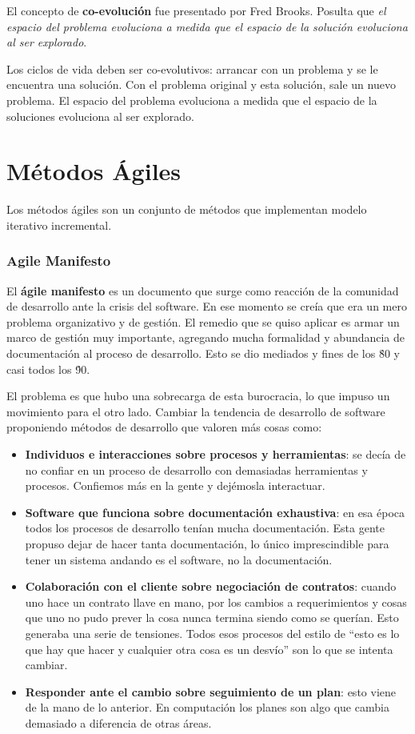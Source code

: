 \documentclass[]{article}
\begin{document}
El concepto de \textbf{co-evolución} fue presentado por Fred Brooks. Posulta que \emph{el espacio del problema evoluciona a medida que el espacio de la solución evoluciona al ser explorado}.


Los ciclos de vida deben ser co-evolutivos: arrancar con un problema y se le encuentra una solución. Con el problema original y esta solución, sale un nuevo problema. El espacio del problema evoluciona a medida que el espacio de la soluciones evoluciona al ser explorado.

\section{Métodos Ágiles}
Los métodos ágiles son un conjunto de métodos que implementan modelo iterativo incremental.

\subsubsection{Agile Manifesto}
El \textbf{ágile manifesto} es un documento que surge como reacción de la comunidad de desarrollo ante la crisis del software. En ese momento se creía que era un mero problema organizativo y de gestión. El remedio que se quiso aplicar es armar un marco de gestión muy importante, agregando mucha formalidad y abundancia de documentación al proceso de desarrollo. Esto se dio mediados y fines de los \'80 y casi todos los \'90.

El problema es que hubo una sobrecarga de esta burocracia, lo que impuso un movimiento para el otro lado. Cambiar la tendencia de desarrollo de software proponiendo métodos de desarrollo que valoren más cosas como:

\begin{itemize}
	\item \textbf{Individuos e interacciones sobre procesos y herramientas}: se decía de no confiar en un proceso de desarrollo con demasiadas herramientas y procesos. Confiemos más en la gente y dejémosla interactuar.
	\item \textbf{Software que funciona sobre documentación exhaustiva}: en esa época todos los procesos de desarrollo tenían mucha documentación. Esta gente propuso dejar de hacer tanta documentación, lo único imprescindible para tener un sistema andando es el software, no la documentación.
	\item \textbf{Colaboración con el cliente sobre negociación de contratos}: cuando uno hace un contrato llave en mano, por los cambios a requerimientos y cosas que uno no pudo prever la cosa nunca termina siendo como se querían. Esto generaba una serie de tensiones. Todos esos procesos del estilo de ``esto es lo que hay que hacer y cualquier otra cosa es un desvío'' son lo que se intenta cambiar.
	\item \textbf{Responder ante el cambio sobre seguimiento de un plan}: esto viene de la mano de lo anterior. En computación los planes son algo que cambia demasiado a diferencia de otras áreas.
\end{itemize}
\end{document}
